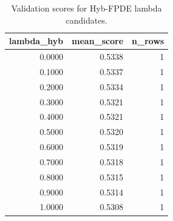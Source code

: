 \begin{table}[t]
\caption{Validation scores for Hyb-FPDE lambda candidates.}
\label{tab:lambda_distribution_computed}
\centering
\begin{tabular}{rrr}
\toprule
lambda\_hyb & mean\_score & n\_rows \\
\midrule
0.0000 & 0.5338 & 1 \\
0.1000 & 0.5337 & 1 \\
0.2000 & 0.5334 & 1 \\
0.3000 & 0.5321 & 1 \\
0.4000 & 0.5321 & 1 \\
0.5000 & 0.5320 & 1 \\
0.6000 & 0.5319 & 1 \\
0.7000 & 0.5318 & 1 \\
0.8000 & 0.5315 & 1 \\
0.9000 & 0.5314 & 1 \\
1.0000 & 0.5308 & 1 \\
\bottomrule
\end{tabular}

\end{table}
